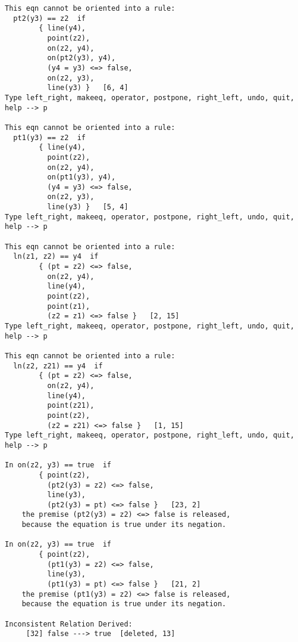\begin{verbatim}
This eqn cannot be oriented into a rule: 
  pt2(y3) == z2  if  
        { line(y4),
          point(z2),
          on(z2, y4),
          on(pt2(y3), y4),
          (y4 = y3) <=> false,
          on(z2, y3),
          line(y3) }   [6, 4]
Type left_right, makeeq, operator, postpone, right_left, undo, quit, help --> p

This eqn cannot be oriented into a rule: 
  pt1(y3) == z2  if  
        { line(y4),
          point(z2),
          on(z2, y4),
          on(pt1(y3), y4),
          (y4 = y3) <=> false,
          on(z2, y3),
          line(y3) }   [5, 4]
Type left_right, makeeq, operator, postpone, right_left, undo, quit, help --> p

This eqn cannot be oriented into a rule: 
  ln(z1, z2) == y4  if  
        { (pt = z2) <=> false,
          on(z2, y4),
          line(y4),
          point(z2),
          point(z1),
          (z2 = z1) <=> false }   [2, 15]
Type left_right, makeeq, operator, postpone, right_left, undo, quit, help --> p

This eqn cannot be oriented into a rule: 
  ln(z2, z21) == y4  if  
        { (pt = z2) <=> false,
          on(z2, y4),
          line(y4),
          point(z21),
          point(z2),
          (z2 = z21) <=> false }   [1, 15]
Type left_right, makeeq, operator, postpone, right_left, undo, quit, help --> p

In on(z2, y3) == true  if  
        { point(z2),
          (pt2(y3) = z2) <=> false,
          line(y3),
          (pt2(y3) = pt) <=> false }   [23, 2]
    the premise (pt2(y3) = z2) <=> false is released,
    because the equation is true under its negation.

In on(z2, y3) == true  if  
        { point(z2),
          (pt1(y3) = z2) <=> false,
          line(y3),
          (pt1(y3) = pt) <=> false }   [21, 2]
    the premise (pt1(y3) = z2) <=> false is released,
    because the equation is true under its negation.

Inconsistent Relation Derived:
     [32] false ---> true  [deleted, 13]


\end{verbatim}

